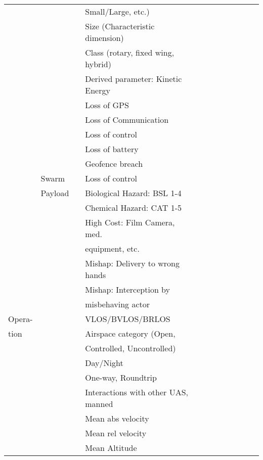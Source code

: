 \documentclass{report}
\begin{document}
\begin{centering}
\begin{longtable}{|l|l|l|l|c|c|c|c|c|c|c|c|}
  & & & Small/Large, etc.) & & & & & & & & \\\cline{4-4}
   & & & Size (Characteristic dimension) & & & & & & & & \\\cline{4-4}
   & & & Class (rotary, fixed wing, hybrid) & & & & & & & & \\\cline{4-4}
   & & & Derived parameter: Kinetic Energy & & & & & & & & \\\cline{4-4}
   & & & Loss of GPS & & & & & & & & \\\cline{4-4}
   & & & Loss of Communication & & & & & & & & \\\cline{4-4}
   & & & Loss of control & & & & & & & & \\\cline{4-4}
   & & & Loss of battery & & & & & & & & \\\cline{4-4}
   & & & Geofence breach & & & & & & & & \\\cline{2-4}
   & Swarm & & Loss of control & & & & & & & & \\\cline{2-4}
   & Payload & & Biological Hazard: BSL 1-4 & & & & & & & & \\\cline{4-4}
   & & & Chemical Hazard: CAT 1-5 & & & & & & & & \\\cline{4-4}
   & & & High Cost: Film Camera, med. & & & & & & & & \\
   & & & equipment, etc. & & & & & & & & \\\cline{4-4}
   & & & Mishap: Delivery to wrong hands & & & & & & & & \\\cline{4-4}
   & & & Mishap: Interception by & & & & & & & & \\
   & & & misbehaving actor  & & & & & & & & \\\cline{1-4}
   Opera- & & & VLOS/BVLOS/BRLOS & & & & & & & & \\\cline{4-4}
   tion & & & Airspace category (Open, & & & & & & & & \\
   & & & Controlled, Uncontrolled) & & & & & & & & \\\cline{4-4}
   & & & Day/Night & & & & & & & & \\\cline{4-4}
   & & & One-way, Roundtrip & & & & & & & & \\\cline{4-4}
   & & & Interactions with other UAS, manned & & & & & & & & \\\cline{4-4}
   & & & Mean abs velocity & & & & & & & & \\\cline{4-4}
   & & & Mean rel velocity & & & & & & & & \\\cline{4-4}
   & & & Mean Altitude & & & & & & & & \\\cline{4-4}

\end{longtable}
\end{centering}
\end{document}
